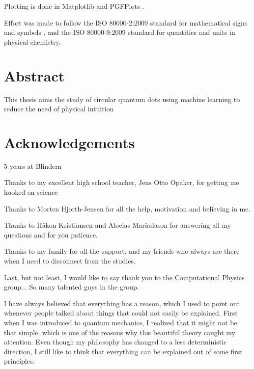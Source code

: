 Plotting is done in Matplotlib \cite{hunter_matplotlib:_2007} and PGFPlots \cite{tantau_graph_2013}. 

Effort was made to follow the ISO 80000-2:2009 standard for mathematical signs and symbols \cite{iso/tc_12_iso_nodate}, and the ISO 80000-9:2009 standard for quantities and units in physical chemistry\cite{iso/tc_12_iso_nodate-1}. 
\newpage
\section*{Abstract}
This thesis aims the study of circular quantum dots using machine learning to reduce the need of physical intuition

\thispagestyle{empty}
\cleardoublepage

\section*{Acknowledgements}
5 years at Blindern

Thanks to my excellent high school teacher, Jens Otto Opaker, for getting me hooked on science

Thanks to Morten Hjorth-Jensen for all the help, motivation and believing in me.

Thanks to Håkon Kristiansen and Alocias Mariadason for answering all my questions and for you patience. 

Thanks to my family for all the support, and my friends who always are there when I need to disconnect from the studies. 

Last, but not least, I would like to say thank you to the Computational Physics group... So many talented guys in the group. 

I have always believed that everything has a reason, which I used to point out whenever people talked about things that could not easily be explained. First when I was introduced to quantum mechanics, I realized that it might not be that simple, which is one of the reasons why this beautiful theory caught my attention. Even though my philosophy has changed to a less deterministic direction, I still like to think that everything can be explained out of some first principles. 
    
\thispagestyle{empty}
\cleardoublepage

{%
    \tableofcontents
    \thispagestyle{empty}
    \clearpage}%

\thispagestyle{empty}
\clearpage


